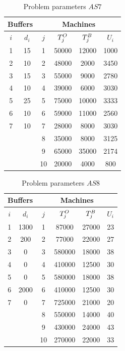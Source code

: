 \documentclass{ifacconf}
\begin{document}
\begin{table}[h!]
	\centering
	\small
	\begin{tabular}{||c|c||c|c|c|c||}
		\hline \hline
		\multicolumn{2}{||c||}{Buffers}&\multicolumn{4}{|c||}{Machines}\\
		\hline
		$i$ & $d_i$ & $j$  & $T^{\rm O}_j$ & $T^{\rm B}_j$ & $U_i$ \\
		\hline
		1 & 15 & 1 & 50000 & 12000 & 1000\\
		2 & 10 & 2 & 48000 & 2000 & 3450\\
		3 & 15 & 3 & 55000 & 9000 & 2780 \\
		4 & 10 & 4 & 39000 & 6000 & 3030\\
		5 &  25  & 5 & 75000 & 10000 & 3333\\
		6 &  10 & 6 & 59000 & 11000 & 2560\\
		7 & 10 & 7 & 28000 & 8000 & 3030\\
			&  & 8 & 35000 & 8000 & 3125\\
			&  & 9 & 65000 &  35000 & 2174\\
			&  & 10 & 20000 & 4000 & 800\\
		\hline \hline
	\end{tabular}
	\caption{Problem parameters $\textit{AS7}$} \label{tabl:as7}
\end{table}
\begin{table}[h!]
	\centering
	\small
	\begin{tabular}{||c|c||c|c|c|c||}
		\hline \hline
		\multicolumn{2}{||c||}{Buffers}&\multicolumn{4}{|c||}{Machines}\\
		\hline
		$i$ & $d_i$ & $j$  & $T^{\rm O}_j$ & $T^{\rm B}_j$ & $U_i$ \\
		\hline
		1 & 1300 & 1 & 87000 & 27000 & 23\\
		2 & 200 & 2 & 77000 & 22000 & 27\\
		3 & 0 & 3 & 580000 & 18000 & 38\\
		4 & 0 & 4 & 410000 & 12500 & 30\\
		5 & 0 & 5 & 580000 & 18000 & 38\\
		6 & 2000 & 6 & 410000 & 12500 & 30\\
		7 & 0 & 7 & 725000 & 21000 & 20\\
		  &  & 8 & 550000 & 14000 & 40\\
		 &  & 9 & 430000 & 24000 & 43\\
		   &  & 10 & 270000 & 22000 & 33\\
		\hline \hline
	\end{tabular}
	\caption{Problem parameters $\textit{AS8}$} \label{tabl:as8}
\end{table}
\end{document}
